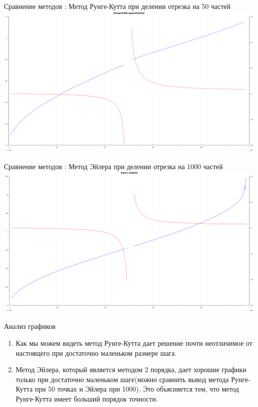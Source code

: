 \documentclass{beamer}
\begin{document}
\begin{frame}{Сравнение методов : Метод Рунге-Кутта при делении отрезка на 50 частей}
	\includegraphics[width=\textwidth]{runge50}
\end{frame}

\begin{frame}{Сравнение методов : Метод Эйлера при делении отрезка на 1000 частей}
    \includegraphics[width=\textwidth]{euler}
\end{frame}

\begin{frame}{Анализ графиков}
    \begin{enumerate}
        \item Как мы можем видеть метод Рунге-Кутта дает решение почти неотличимое от настоящего при достаточно маленьком размере шага.
        \item Метод Эйлера, который является методом 2 порядка, дает хорошие графики только при достаточно маленьком шаге(можно сравнить вывод метода Рунге-Кутта при 50 точках и Эйлера при 1000). Это объясняется тем, что метод Рунге-Кутта имеет больший порядок точности.
    \end{enumerate}
\end{frame}
\end{document}
